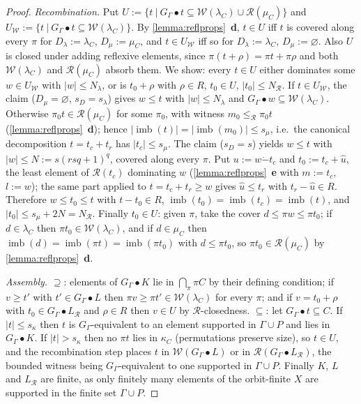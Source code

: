 \documentclass{article}
\theoremstyle{definition}
\newcommand{\cR}{\mathcal{R}}
\newcommand{\cW}{\mathcal{W}}
\newcommand{\monus}{\mathbin{\dot-}}
\newcommand{\imb}{\operatorname{imb}}
\begin{document}
\begin{proof}
    {\it Recombination.} Put $U:=\{t\ |\ G_\Gamma\bullet t\subseteq\cW(\lambda_C)\cup\cR(\mu_C)\}$ and $U_\cW:=\{t\ |\ G_\Gamma\bullet t\subseteq\cW(\lambda_C)\}$. By \cref{lemma:reflprops}~{\bf d}, $t\in U$ iff $t$ is covered along every $\pi$ for $D_\lambda:=\lambda_C$, $D_\mu:=\mu_C$, and $t\in U_\cW$ iff so for $D_\lambda:=\lambda_C$, $D_\mu:=\varnothing$. Also $U$ is closed under adding reflexive elements, since $\pi(t+\rho)=\pi t+\pi\rho$ and both $\cW(\lambda_C)$ and $\cR(\mu_C)$ absorb them. We show: every $t\in U$ either dominates some $w\in U_\cW$ with $|w|\leq N_\lambda$, or is $t_0+\rho$ with $\rho\in R$, $t_0\in U$, $|t_0|\leq N_\cR$. If $t\in U_\cW$, the claim ($D_\mu=\varnothing$, $s_D=s_\lambda$) gives $w\leq t$ with $|w|\leq N_\lambda$ and $G_\Gamma\bullet w\subseteq\cW(\lambda_C)$. Otherwise $\pi_0t\in\cR(\mu_C)$ for some $\pi_0$, with witness $m_0\leq_\cR\pi_0t$ (\cref{lemma:reflprops}~{\bf d}); hence $|\imb(t)|=|\imb(m_0)|\leq s_\mu$, i.e.\ the canonical decomposition $t=t_c+t_r$ has $|t_c|\leq s_\mu$. The claim ($s_D=s$) yields $w\leq t$ with $|w|\leq N:=s(rsq+1)^q$, covered along every $\pi$. Put $u:=w\monus t_c$ and $t_0:=t_c+\hat u$, the least element of $\cR(t_c)$ dominating $w$ (\cref{lemma:reflprops}~{\bf e} with $m:=t_c$, $l:=w$); the same part applied to $t=t_c+t_r\geq w$ gives $\hat u\leq t_r$ with $t_r-\hat u\in R$. Therefore $w\leq t_0\leq t$ with $t-t_0\in R$, $\imb(t_0)=\imb(t_c)=\imb(t)$, and $|t_0|\leq s_\mu+2N=N_\cR$. Finally $t_0\in U$: given $\pi$, take the cover $d\leq\pi w\leq\pi t_0$; if $d\in\lambda_C$ then $\pi t_0\in\cW(\lambda_C)$, and if $d\in\mu_C$ then $\imb(d)=\imb(\pi t)=\imb(\pi t_0)$ with $d\leq\pi t_0$, so $\pi t_0\in\cR(\mu_C)$ by \cref{lemma:reflprops}~{\bf d}.

    {\it Assembly.} $\supseteq$: elements of $G_\Gamma\bullet K$ lie in $\bigcap_\pi\pi C$ by their defining condition; if $v\geq t'$ with $t'\in G_\Gamma\bullet L$ then $\pi v\geq\pi t'\in\cW(\lambda_C)$ for every $\pi$; and if $v=t_0+\rho$ with $t_0\in G_\Gamma\bullet L_\cR$ and $\rho\in R$ then $v\in U$ by $\cR$-closedness. $\subseteq$: let $G_\Gamma\bullet t\subseteq C$. If $|t|\leq s_\kappa$ then $t$ is $G_\Gamma$-equivalent to an element supported in $\Gamma\cup P$ and lies in $G_\Gamma\bullet K$. If $|t|>s_\kappa$ then no $\pi t$ lies in $\kappa_C$ (permutations preserve size), so $t\in U$, and the recombination step places $t$ in $\cW(G_\Gamma\bullet L)$ or in $\cR(G_\Gamma\bullet L_\cR)$, the bounded witness being $G_\Gamma$-equivalent to one supported in $\Gamma\cup P$. Finally $K$, $L$ and $L_\cR$ are finite, as only finitely many elements of the orbit-finite $X$ are supported in the finite set $\Gamma\cup P$.
\end{proof}
\end{document}
